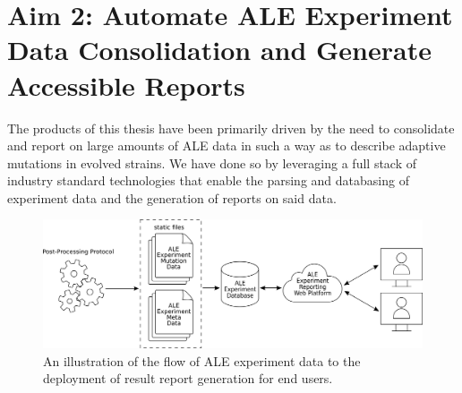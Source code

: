 \documentclass[12pt,final,masters,chapterheads]{ucsd}  %
\begin{document}
%
%
%
%

\chapter{Aim 2: Automate ALE Experiment Data Consolidation and Generate Accessible Reports}

%
%



The products of this thesis have been primarily driven by the need to consolidate and report on large amounts of ALE data in such a way as to describe adaptive mutations in evolved strains. We have done so by leveraging a full stack of industry standard technologies that enable the parsing and databasing of experiment data and the generation of reports on said data.
\begin{figure}[H]
  \centering
  \includegraphics[width=1\textwidth]{simple_deployment_diagram.png}
  \caption{An illustration of the flow of ALE experiment data to the deployment of result report generation for end users.}
  \label{fig:simple_deployment_diagram}
\end{figure}
\end{document}
